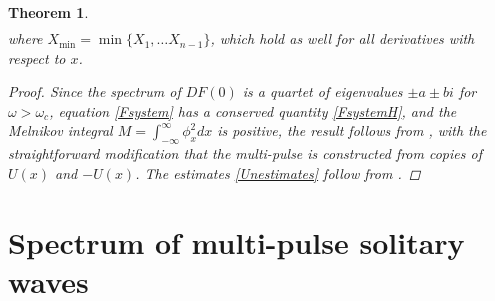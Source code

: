 \documentclass[12pt]{elsarticle}
\newtheorem{theorem}{Theorem}
\begin{document}
\begin{theorem}
\begin{equation}
\begin{aligned}
\end{aligned}
\end{equation}
where $X_{\mathrm{min}} = \min \{ X_1, \dots X_{n-1} \}$, which hold as well for all derivatives with respect to $x$.
\begin{proof}
Since the spectrum of $DF(0)$ is a quartet of eigenvalues $\pm a \pm b i$ for $\omega > \omega_c$, equation \cref{Fsystem} has a conserved quantity \cref{FsystemH}, and the Melnikov integral $M = \int_{-\infty}^\infty \phi_x^2 dx$ is positive, the result follows from \cite[Theorem~3.6]{SandstedeStrut}, with the straightforward modification that the multi-pulse is constructed from copies of $U(x)$ and $-U(x)$. The estimates \cref{Unestimates} follow from \cite{Sandstede1993, Sandstede1998}.
\end{proof}
\end{theorem}

\section{Spectrum of multi-pulse solitary waves}\label{sec:multieig}
\end{document}
